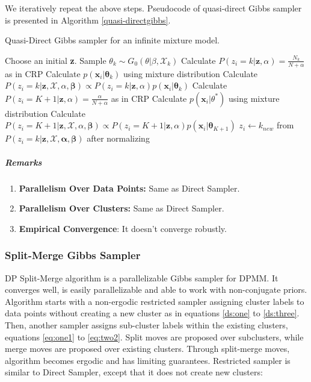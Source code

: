 \documentclass[12pt, a4paper]{article}
\begin{document}
We iteratively repeat the above steps. Pseudocode of quasi-direct Gibbs sampler is presented in Algorithm \ref{quasi-directgibbs}.



\begin{algorithm}[H]
  \caption{Quasi-Direct Gibbs sampler for an infinite  mixture model.}\label{quasi-directgibbs}
  \begin{algorithmic}[1]
    
  \State Choose an initial \textbf{z}.
   
     
            \State Sample $\theta_k \sim G_0(\theta|\beta,\mathcal{X}_{k})$ 
    \EndFor
         
            \State Calculate $P(z_i = k | \mathbf{z},\alpha) = \frac{N_{k}}{N+\alpha}$ as in CRP
            \State Calculate $p(\mathbf{x}_i|\mathbf{\theta}_k)$ using mixture distribution
            \State Calculate $P(z_i = k | \mathbf{z},\mathcal{X},\alpha,\mathbf{\beta}) \propto P(z_i = k | \mathbf{z},\alpha)p(\mathbf{x}_i|\mathbf{\theta}_k)$
        \EndFor
        \State Calculate $P(z_i = K+1 | \mathbf{z},\alpha) = \frac{\alpha}{N+\alpha}$ as in CRP 
        \State Calculate $p(\mathbf{x}_i|\theta^*)$ using mixture distribution
        \State Calculate $P(z_i = K+1 | \mathbf{z},\mathcal{X},\alpha, \mathbf{\beta}) \propto P(z_i = K+1 | \mathbf{z},\alpha)p(\mathbf{x}_i|\mathbf{\theta}_{K+1})$
        \State $z_i \gets k_{new}$ from $P(z_i = k | \mathbf{z},\mathcal{X},\mathbf{\alpha},\mathbf{\beta})$ after normalizing
    \EndFor
  \EndFor
  \end{algorithmic}
\end{algorithm}

\subparagraph{Remarks}
\begin{enumerate}
   \item  \textbf{Parallelism Over Data Points:} Same as Direct Sampler.
   \item  \textbf{Parallelism Over Clusters:}  Same as Direct Sampler.
   \item  \textbf{Empirical Convergence}:
    It doesn't converge robustly.
\end{enumerate}

\subsubsection{Split-Merge Gibbs Sampler}
DP Split-Merge algorithm \cite{Chang2013dpmm} is a parallelizable Gibbs sampler for DPMM. It converges well, is easily parallelizable and able to work with non-conjugate priors. Algorithm starts with a non-ergodic restricted sampler assigning cluster labels to data points without creating a new cluster as in equations \ref{ds:one} to \ref{ds:three}. Then, another sampler assigns sub-cluster labels within the existing clusters, equations \ref{eq:one1} to \ref{eq:two2}. Split moves are proposed over subclusters, while merge moves are proposed over existing clusters. Through split-merge moves, algorithm becomes ergodic and has limiting guarantees. Restricted sampler is similar to Direct Sampler, except that it does not create new clusters:
\end{document}
